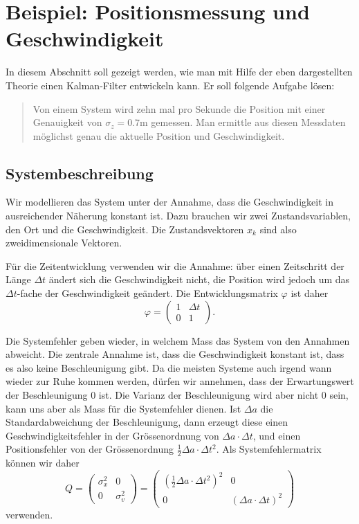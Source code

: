 \section{Beispiel: Positionsmessung und Geschwindigkeit}
In diesem Abschnitt soll gezeigt werden, wie man mit Hilfe der
eben dargestellten Theorie einen Kalman-Filter entwickeln kann.
Er soll folgende Aufgabe lösen:
\begin{quote}
Von einem System wird zehn mal
pro Sekunde die Position mit einer Genauigkeit von $\sigma_z=0.7\text{m}$
gemessen.
Man ermittle aus diesen Messdaten möglichst genau die aktuelle Position
und Geschwindigkeit.
\end{quote}
\subsection{Systembeschreibung}
Wir modellieren das System unter der Annahme, dass die Geschwindigkeit in
ausreichender Näherung konstant ist.
Dazu brauchen wir zwei Zustandsvariablen, den Ort und die Geschwindigkeit.
Die Zustandsvektoren $x_k$ sind also zweidimensionale Vektoren.

Für die Zeitentwicklung verwenden wir die Annahme: über einen Zeitschritt
der Länge $\Delta t$
ändert sich die Geschwindigkeit nicht, die Position wird jedoch 
um das $\Delta t$-fache der Geschwindigkeit geändert.
Die Entwicklungsmatrix $\varphi$ ist daher
\[
\varphi=\begin{pmatrix}
1&\Delta t\\
0&1
\end{pmatrix}.
\]

Die Systemfehler geben wieder, in welchem Mass das System von den Annahmen
abweicht.
Die zentrale Annahme ist, dass die Geschwindigkeit konstant ist, dass es
also keine Beschleunigung gibt.
Da die meisten Systeme auch irgend wann wieder zur Ruhe kommen werden,
dürfen wir annehmen, dass der Erwartungswert der Beschleunigung $0$ ist.
Die Varianz der Beschleunigung wird aber nicht 0 sein, kann uns aber als
Mass für die Systemfehler dienen.
Ist $\Delta a$ die Standardabweichung der Beschleunigung, dann erzeugt
diese einen Geschwindigkeitsfehler in der Grössenordnung von
$\Delta a\cdot \Delta t$, und einen Positionsfehler von der Grössenordnung
$\frac12\Delta a\cdot\Delta t^2$.
Als Systemfehlermatrix können wir daher 
\[
Q=
\begin{pmatrix}
\sigma_x^2&0\\
0&\sigma_v^2
\end{pmatrix}
=
\begin{pmatrix}
(\frac12\Delta a\cdot\Delta t^2)^2&0\\
0&(\Delta a\cdot\Delta t)^2
\end{pmatrix}
\]
verwenden.

